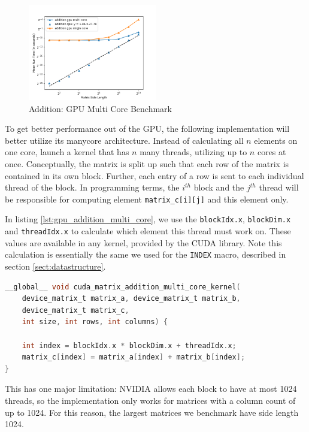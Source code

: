 \begin{figure}
    \centering
    \includegraphics[width=0.5\textwidth]{SavedBenchmarksAndDiagrams/Machine 2/Addition/CPU, GPU SC, GPU MC.png}
    \caption{Addition: GPU Multi Core Benchmark}
    \label{fig:addition_gpu_mc_bench}
\end{figure}

To get better performance out of the GPU, the following implementation will better utilize its manycore architecture. Instead of calculating all $n$ elements on one core, launch a kernel that has $n$ many threads, utilizing up to $n$ cores at once. Conceptually, the matrix is split up such that each row of the matrix is contained in its own block. Further, each entry of a row is sent to each individual thread of the block. In programming terms, the $i^{th}$ block and the $j^{th}$ thread will be responsible for computing element \texttt{matrix\_c[i][j]} and this element only. 

In listing \ref{lst:gpu_addition_multi_core}, we use the \texttt{blockIdx.x}, \texttt{blockDim.x} and \texttt{threadIdx.x} to calculate which element this thread must work on. These values are available in any kernel, provided by the CUDA library. Note this calculation is essentially the same we used for the \texttt{INDEX} macro, described in section \ref{sect:datastructure}.

\begin{lstlisting}[language=C, caption={GPU addition multi core}, label={lst:gpu_addition_multi_core}]
__global__ void cuda_matrix_addition_multi_core_kernel(
    device_matrix_t matrix_a, device_matrix_t matrix_b, 
    device_matrix_t matrix_c, 
    int size, int rows, int columns) {
    
    int index = blockIdx.x * blockDim.x + threadIdx.x;
    matrix_c[index] = matrix_a[index] + matrix_b[index];
}
\end{lstlisting}

This has one major limitation: NVIDIA allows each block to have at most 1024 threads, so the implementation only works for matrices with a column count of up to 1024. For this reason, the largest matrices we benchmark have side length 1024.


